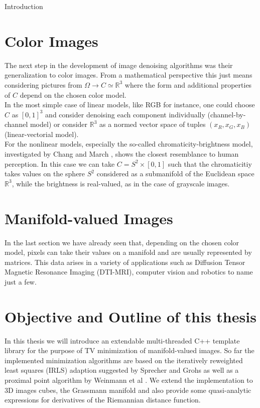 \begin{chapter}{Introduction}


\section{Color Images}
The next step in the development of image denoising algorithms was their generalization to color images. From a mathematical perspective this just means considering pictures
from $\Omega\to C\simeq \mathbb{R}^3$ where the form and additional properties of $C$ depend on the chosen color model. \\
In the most simple case of linear models, like RGB for instance, one could choose $C$ as $[0,1]^3$ and consider denoising each component individually (channel-by-channel model)
or consider $\mathbb{R}^3$ as a normed vector space of tuples $(x_R, x_G, x_B)$ (linear-vectorial model).\\
For the nonlinear models, especially the so-called chromaticity-brightness model, investigated by Chang and March \cite{Kang}, shows the closest resemblance to human perception.
In this case we can take $C=S^2\times [0,1]$ such that the chromaticitiy takes values on the sphere $S^2$ considered as a submanifold of the Euclidean space $\mathbb{R}^3$, 
while the brightness is real-valued, as in the case of grayscale images.

\section{Manifold-valued Images} %
\label{sec:Manifold-valued Images}
In the last section we have already seen that, depending on the chosen color model, pixels can take their values on a manifold and are usually represented by matrices.
This data arises in a variety of applications such as Diffusion Tensor Magnetic Resonance Imaging (DTI-MRI), computer vision and robotics to name just a few.

\section{Objective and Outline of this thesis}
In this thesis we will introduce an extendable multi-threaded C++ template library for the purpose of TV minimization of manifold-valued images. 
So far the implemented minimization algorithms are based on the iteratively reweighted least squares (IRLS) adaption suggested by Sprecher and Grohs \cite{Grohssprecher} as well as a 
proximal point algorithm by Weinmann et al \cite{Weinmann}. We extend the implementation to 3D images cubes, the Grassmann manifold and also provide some quasi-analytic expressions
for derivatives of the Riemannian distance function.\\


\end{chapter}
